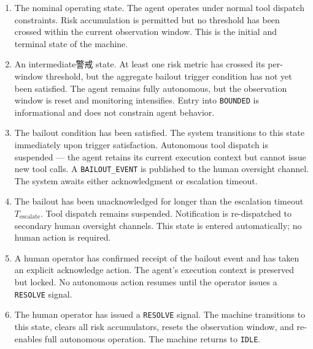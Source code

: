 \begin{enumerate}

\item[\texttt{IDLE}] The nominal operating state. The agent operates under normal tool dispatch constraints. Risk accumulation is permitted but no threshold has been crossed within the current observation window. This is the initial and terminal state of the machine.

\item[\texttt{BOUNDED}] An intermediate警戒 state. At least one risk metric has crossed its per-window threshold, but the aggregate bailout trigger condition has not yet been satisfied. The agent remains fully autonomous, but the observation window is reset and monitoring intensifies. Entry into \texttt{BOUNDED} is informational and does not constrain agent behavior.

\item[\texttt{BAIL\_PENDING}] The bailout condition has been satisfied. The system transitions to this state immediately upon trigger satisfaction. Autonomous tool dispatch is suspended — the agent retains its current execution context but cannot issue new tool calls. A \texttt{BAILOUT\_EVENT} is published to the human oversight channel. The system awaits either acknowledgment or escalation timeout.

\item[\texttt{ESCALATING}] The bailout has been unacknowledged for longer than the escalation timeout $T_{\text{escalate}}$. Tool dispatch remains suspended. Notification is re-dispatched to secondary human oversight channels. This state is entered automatically; no human action is required.

\item[\texttt{HUMAN\_ACKNOWLEDGED}] A human operator has confirmed receipt of the bailout event and has taken an explicit acknowledge action. The agent's execution context is preserved but locked. No autonomous action resumes until the operator issues a \texttt{RESOLVE} signal.

\item[\texttt{RESOLVED}] The human operator has issued a \texttt{RESOLVE} signal. The machine transitions to this state, clears all risk accumulators, resets the observation window, and re-enables full autonomous operation. The machine returns to \texttt{IDLE}.

\end{enumerate}

\bigskip

